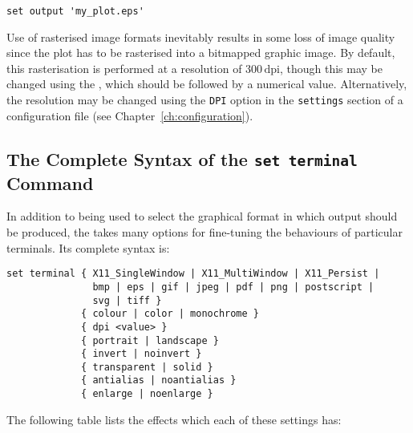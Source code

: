 \begin{verbatim}
set output 'my_plot.eps'
\end{verbatim}

Use of rasterised image formats inevitably results in some loss of image
quality since the plot has to be rasterised into a bitmapped graphic image. By
default, this rasterisation is performed at a resolution of
$300\,\mathrm{dpi}$, though this may be changed using the , which should be followed by a numerical value. Alternatively, the
resolution may be changed using the {\tt DPI} option in the {\tt settings}
section of a configuration file (see Chapter~\ref{ch:configuration}).

\subsection{The Complete Syntax of the {\tt set terminal} Command}

In addition to being used to select the graphical format in which output should
be produced, the  takes many options for fine-tuning the
behaviours of particular terminals. Its complete syntax is:

\begin{verbatim}
set terminal { X11_SingleWindow | X11_MultiWindow | X11_Persist |
               bmp | eps | gif | jpeg | pdf | png | postscript |
               svg | tiff }
             { colour | color | monochrome }
             { dpi <value> }
             { portrait | landscape }
             { invert | noinvert }
             { transparent | solid }
             { antialias | noantialias }
             { enlarge | noenlarge }
\end{verbatim}

The following table lists the effects which each of these settings has:

